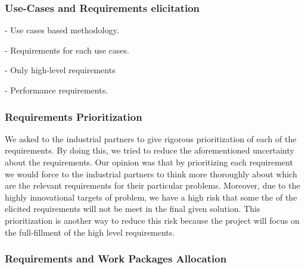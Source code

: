 \documentclass[11pt, oneside]{article}   	%
\begin{document}
% 
% 
%
%
%

\subsubsection*{Use-Cases and Requirements elicitation}

- Use cases based  methodology. 

- Requirements for each use cases. 

- Only high-level requirements

- Performance requirements. 

\subsubsection*{Requirements Prioritization}

We asked to the industrial partners to give rigorous prioritization of each of the requirements. By doing this, we tried to reduce the aforementioned uncertainty about the requirements. Our opinion was that by prioritizing each requirement we would force to the industrial partners to think more thoroughly about which are the relevant requirements for their particular problems. Moreover, due to the highly innovational targets of problem, we have a high risk that some the of the elicited requirements will not be meet in the final given solution. This prioritization is another way to reduce this risk because the project will focus on the full-fillment of the high level requirements. 

\subsubsection*{Requirements  and Work Packages Allocation}
\end{document}
